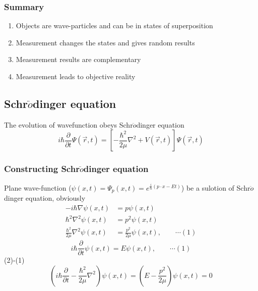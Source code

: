 \begin{frame}
    \frametitle{Summary}
    \begin{enumerate}
        \item Objects are wave-particles and can be in states of superposition
        \item Measurement changes the states and gives random results
        \item Measurement results are complementary
        \item Measurement leads to objective reality
    \end{enumerate}
\end{frame}

\subsection{Schr$\ddot{o}$dinger equation}
\begin{frame}
    \begin{tcolorbox}[colback=yellow!10,colframe=red!75!black,title=Basic assumption 2/5]
        The evolution of wavefunction obeys Schr$\ddot{o}$dinger equation
        \begin{equation*}
            i\hbar \frac{\partial }{\partial t} \Psi (\overrightarrow{r},t ) =\left [ -\frac{\hbar^2}{2\mu }\nabla ^2 + V(\overrightarrow{r},t ) \right ]\Psi (\overrightarrow{r}, t ) 
        \end{equation*}
    \end{tcolorbox}
\end{frame}

\begin{frame}
    \frametitle{Constructing Schr$\ddot{o}$dinger equation}
    \bullet Plane wave-function ($\psi(x,t)=\Psi_p(x,t)=e^{\frac{i}{\hbar}(p\cdot x-Et)}$) be a sulotion of Schr$\ddot{o}$dinger equation, obviously
    \begin{equation*}
        \begin{split}
       -i\hbar \nabla \psi(x,t) &=p\psi(x,t) \\
       \hbar^2 \nabla^2 \psi(x,t) &=p^2\psi(x,t) \\
       \frac{\hbar^2}{2\mu} \nabla^2 \psi(x,t) &=\frac{p^2}{2\mu} \psi(x,t) , \qquad \cdots (1)
        \end{split}
    \end{equation*}
    \begin{equation*}
       i\hbar \frac{\partial }{\partial t} \psi(x,t) =E\psi(x,t)  , \qquad \cdots (1)
     \end{equation*}
    (2)-(1)
    \begin{equation*}
        (i\hbar \frac{\partial }{\partial t} - \frac{\hbar^2}{2\mu} \nabla^2 )\psi(x,t) =(E-\frac{p^2}{2\mu})\psi(x,t)=0  
    \end{equation*}
\end{frame}

